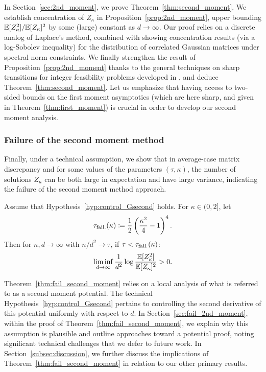 \noindent
In Section~\ref{sec:2nd_moment}, we prove Theorem~\ref{thm:second_moment}. 
We establish concentration of $Z_\kappa$ in Proposition~\ref{prop:2nd_moment}, 
upper bounding $\mathbb{E}[Z_\kappa^2] / \mathbb{E}[Z_\kappa]^2$ by some (large) constant as $d \to \infty$. 
Our proof relies on a discrete analog of Laplace's method, combined with showing concentration results (via a log-Sobolev inequality) for the distribution of correlated Gaussian matrices under spectral norm constraints.
We finally strengthen the result of Proposition~\ref{prop:2nd_moment} thanks to the general techniques on sharp transitions for integer feasibility problems 
developed in \cite{altschuler2023zero}, and deduce Theorem~\ref{thm:second_moment}.
Let us emphasize that having access to two-sided bounds on the first moment asymptotics (which are here sharp, and given in Theorem~\ref{thm:first_moment}) 
is crucial in order to develop our second moment analysis.

\subsubsection{Failure of the second moment method}

\noindent
Finally, under a technical assumption, we show that in average-case matrix discrepancy and
for some values of the parameters $(\tau, \kappa)$,
the number of solutions $Z_\kappa$ can be both large in expectation and have large variance, indicating the failure of the 
second moment method approach.
\begin{theorem}
    \label{thm:fail_second_moment}
    Assume that Hypothesis~\ref{hyp:control_Gsecond} holds.
    For $\kappa \in (0,2]$, let 
    \begin{equation}\label{eq:tau_f}
        \tau_{{\rm fail.}}(\kappa) \coloneqq \frac{1}{2} \left(\frac{\kappa^2}{4} - 1\right)^4.
    \end{equation}
    Then for $n, d \to \infty$ with $n/d^2 \to \tau$, if $\tau < \tau_{\rm fail.}(\kappa)$:
    \begin{equation}\label{eq:fail_second_moment}
        \liminf_{d \to \infty} \frac{1}{d^2} \log \frac{\mathbb{E}[Z_\kappa^2]}{\mathbb{E}[Z_\kappa]^2} > 0.
    \end{equation}
\end{theorem}
\noindent
Theorem~\ref{thm:fail_second_moment} relies on a local analysis of what is referred to as a second moment potential.
The technical Hypothesis~\ref{hyp:control_Gsecond} pertains to controlling the second derivative of this potential uniformly with respect to $d$.
In Section~\ref{sec:fail_2nd_moment}, within the proof of Theorem~\ref{thm:fail_second_moment},
we explain why this assumption is plausible and outline approaches toward a potential proof, noting significant technical challenges that we defer to future work.
In Section~\ref{subsec:discussion}, we further discuss the implications of Theorem~\ref{thm:fail_second_moment} in relation to our other primary results.


